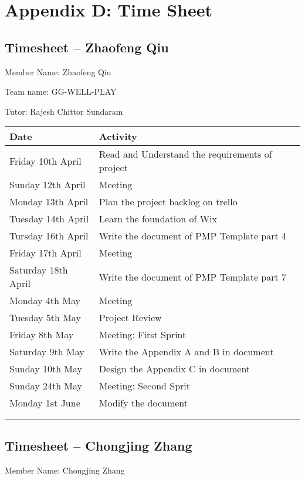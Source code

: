 \chapter*{Appendix D: Time Sheet}

\section*{Timesheet – Zhaofeng Qiu}

Member Name: Zhaofeng Qiu

Team name: GG-WELL-PLAY

Tutor: Rajesh Chittor Sundaram

\begin{tabularx}{0.95\linewidth}{%
	l%
	>{\raggedright\arraybackslash}X}%
	\toprule
	Date & Activity\\
	\midrule
	Friday 10th April & Read and Understand the requirements of project\\
	\midrule
	Sunday 12th April & Meeting\\
	\midrule
	Monday 13th April & Plan the project backlog on trello\\
	\midrule
	Tuesday 14th April & Learn the foundation of Wix\\
	\midrule
	Tursday 16th April & Write the document of PMP Template part 4\\
	\midrule
	Friday 17th April & Meeting\\
	\midrule
	Saturday 18th April & Write the document of PMP Template part 7\\
	\midrule
	Monday 4th May & Meeting\\
	\midrule
	Tuesday 5th May & Project Review\\
	\midrule
	Friday 8th May & Meeting: First Sprint\\
	\midrule
	Saturday 9th May & Write the Appendix A and B in document\\
	\midrule
	Sunday 10th May & Design the Appendix C in document\\
	\midrule
	Sunday 24th May & Meeting: Second Sprit\\
	\midrule
	Monday 1st June & Modify the document\\
	\bottomrule
	\\
	\caption{Timesheet -- Zhaofeng Qiu}  
  \label{tab:timesheetZhaofeng}
\end{tabularx}

\clearpage
\section*{Timesheet – Chongjing Zhang}
Member Name: Chongjing Zhang

